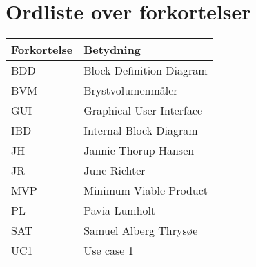 \section*{Ordliste over forkortelser}

\vspace{1cm}
\begin{table}[hbt]
\centering
\label{ordliste}
\begin{tabular}{|l|l|}
\hline
\textbf{Forkortelse             } & \textbf{Betydning             } \\ \hline
BDD & Block Definition Diagram \\ \hline
BVM & Brystvolumenmåler \\ \hline
GUI & Graphical User Interface \\ \hline
IBD & Internal Block Diagram \\ \hline 
JH & Jannie Thorup Hansen \\ \hline
JR & June Richter  \\ \hline
MVP & Minimum Viable Product \\ \hline
PL & Pavia Lumholt \\ \hline
SAT & Samuel Alberg Thrysøe \\ \hline
UC1 & Use case 1 \\ \hline
\end{tabular}
\end{table}